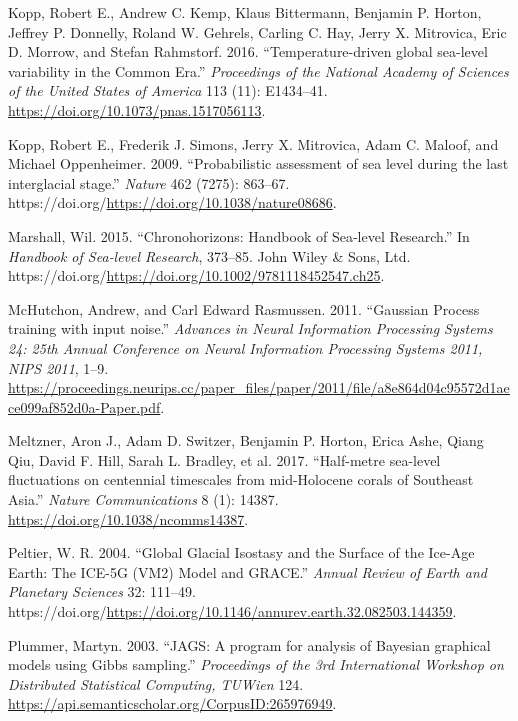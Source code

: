 \begin{CSLReferences}{1}{0}
\leavevmode{}%
Kopp, Robert E., Andrew C. Kemp, Klaus Bittermann, Benjamin P. Horton, Jeffrey P. Donnelly, Roland W. Gehrels, Carling C. Hay, Jerry X. Mitrovica, Eric D. Morrow, and Stefan Rahmstorf. 2016. {``{Temperature-driven global sea-level variability in the Common Era}.''} \emph{Proceedings of the National Academy of Sciences of the United States of America} 113 (11): E1434--41. \url{https://doi.org/10.1073/pnas.1517056113}.

\leavevmode{}%
Kopp, Robert E., Frederik J. Simons, Jerry X. Mitrovica, Adam C. Maloof, and Michael Oppenheimer. 2009. {``{Probabilistic assessment of sea level during the last interglacial stage}.''} \emph{Nature} 462 (7275): 863--67. https://doi.org/\url{https://doi.org/10.1038/nature08686}.

\leavevmode{}%
Marshall, Wil. 2015. {``Chronohorizons: Handbook of Sea‐level Research.''} In \emph{Handbook of Sea‐level Research}, 373--85. John Wiley \& Sons, Ltd. https://doi.org/\url{https://doi.org/10.1002/9781118452547.ch25}.

\leavevmode{}%
McHutchon, Andrew, and Carl Edward Rasmussen. 2011. {``{Gaussian Process training with input noise}.''} \emph{Advances in Neural Information Processing Systems 24: 25th Annual Conference on Neural Information Processing Systems 2011, NIPS 2011}, 1--9. \url{https://proceedings.neurips.cc/paper_files/paper/2011/file/a8e864d04c95572d1aece099af852d0a-Paper.pdf}.

\leavevmode{}%
Meltzner, Aron J., Adam D. Switzer, Benjamin P. Horton, Erica Ashe, Qiang Qiu, David F. Hill, Sarah L. Bradley, et al. 2017. {``{Half-metre sea-level fluctuations on centennial timescales from mid-Holocene corals of Southeast Asia}.''} \emph{Nature Communications} 8 (1): 14387. \url{https://doi.org/10.1038/ncomms14387}.

\leavevmode{}%
Peltier, W. R. 2004. {``{Global Glacial Isostasy and the Surface of the Ice-Age Earth: The ICE-5G (VM2) Model and GRACE}.''} \emph{Annual Review of Earth and Planetary Sciences} 32: 111--49. https://doi.org/\url{https://doi.org/10.1146/annurev.earth.32.082503.144359}.

\leavevmode{}%
Plummer, Martyn. 2003. {``{JAGS: A program for analysis of Bayesian graphical models using Gibbs sampling.}''} \emph{Proceedings of the 3rd International Workshop on Distributed Statistical Computing, TUWien} 124. \url{https://api.semanticscholar.org/CorpusID:265976949}.


\end{CSLReferences}
